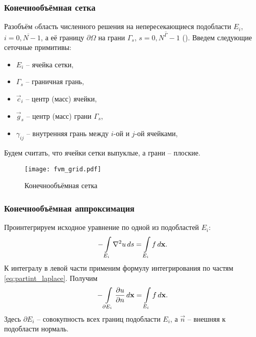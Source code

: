 \subsubsection{Конечнообъёмная сетка}
Разобъём oбласть численного решения на непересекающиеся подобласти $E_i$, $i = \overline{0, N-1}$,
а её границу $\partial \Omega$ на грани $\Gamma_s$, $s = \overline{0, N^\Gamma - 1}$ ().
Введем следующие сеточные примитивы:
\begin{itemize}
\item $E_i$ -- ячейка сетки,
\item $\Gamma_{s}$ -- граничная грань,
\item $\vec c_i$ -- центр (масс) ячейки,
\item $\vec g_s$ -- центр (масс) грани $\Gamma_{s}$,
\item $\gamma_{ij}$ -- внутренняя грань между $i$-ой и $j$-ой ячейками,
\end{itemize}
Будем считать, что ячейки сетки выпуклые, а грани -- плоские.

\begin{figure}[h!]
\centering
\texttt{[image: fvm\_grid.pdf]}
\caption{Конечнообъёмная сетка}
\label{fig:fvm_grid}
\end{figure}

\subsubsection{Конечнообъёмная аппроксимация}

Проинтегрируем исходное уравнение по одной из подобластей $E_i$:
\begin{equation*}
-\arint{\nabla^2 u}{E_i}{s} = \arint{f}{E_i}{\vec x}.
\end{equation*}
К интегралу в левой части применим формулу интегрирования по частям \cref{eq:partint_laplace}. Получим
\begin{equation}
\label{eq:fvm_pois_int}
-\arint{\dfr{u}{n}}{\partial E_i}{\vec x} = \arint{f}{E_i}{\vec x}.
\end{equation}
Здесь $\partial E_i$ -- совокупность всех границ подобласти $E_i$,
а $\vec n$ -- внешняя к подобласти нормаль.


